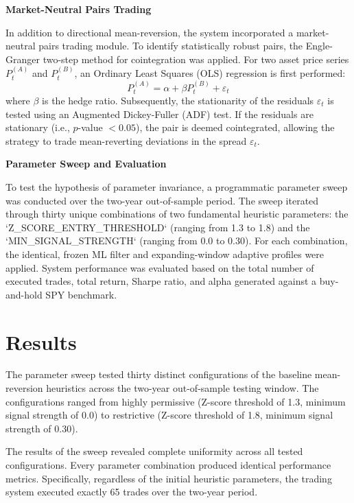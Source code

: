 \documentclass[12pt]{article}
\begin{document}
\textbf{Market-Neutral Pairs Trading}

In addition to directional mean-reversion, the system incorporated a market-neutral pairs trading module. To identify statistically robust pairs, the Engle-Granger two-step method for cointegration was applied. For two asset price series $P^{(A)}_t$ and $P^{(B)}_t$, an Ordinary Least Squares (OLS) regression is first performed:
\begin{equation}
P^{(A)}_t = \alpha + \beta P^{(B)}_t + \varepsilon_t
\end{equation}
where $\beta$ is the hedge ratio. Subsequently, the stationarity of the residuals $\varepsilon_t$ is tested using an Augmented Dickey-Fuller (ADF) test. If the residuals are stationary (i.e., $p$-value $< 0.05$), the pair is deemed cointegrated, allowing the strategy to trade mean-reverting deviations in the spread $\varepsilon_t$.

\textbf{Parameter Sweep and Evaluation}

To test the hypothesis of parameter invariance, a programmatic parameter sweep was conducted over the two-year out-of-sample period. The sweep iterated through thirty unique combinations of two fundamental heuristic parameters: the `Z\_SCORE\_ENTRY\_THRESHOLD` (ranging from 1.3 to 1.8) and the `MIN\_SIGNAL\_STRENGTH` (ranging from 0.0 to 0.30). For each combination, the identical, frozen ML filter and expanding-window adaptive profiles were applied. System performance was evaluated based on the total number of executed trades, total return, Sharpe ratio, and alpha generated against a buy-and-hold SPY benchmark.

\section*{Results}

The parameter sweep tested thirty distinct configurations of the baseline mean-reversion heuristics across the two-year out-of-sample testing window. The configurations ranged from highly permissive (Z-score threshold of 1.3, minimum signal strength of 0.0) to restrictive (Z-score threshold of 1.8, minimum signal strength of 0.30).

The results of the sweep revealed complete uniformity across all tested configurations. Every parameter combination produced identical performance metrics. Specifically, regardless of the initial heuristic parameters, the trading system executed exactly 65 trades over the two-year period. 
\end{document}
